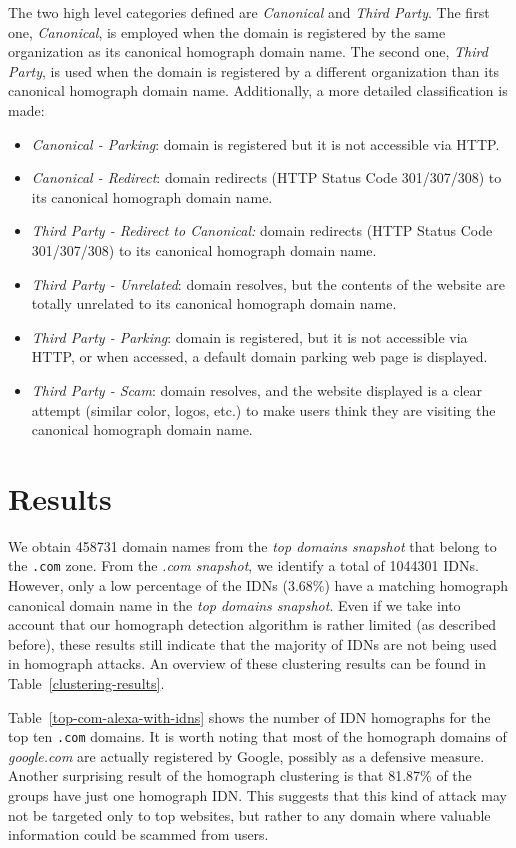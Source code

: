 \documentclass[letterpaper,twocolumn,10pt]{article}
\begin{document}
The two high level categories defined are \textit{Canonical} and \textit{Third Party}.
The first one, \textit{Canonical}, is employed when the domain is registered by the same organization as its canonical homograph domain name.
The second one, \textit{Third Party}, is used when the domain is registered by a different organization than its canonical homograph domain name.
Additionally, a more detailed classification is made:
\begin{itemize}
\setlength{\itemsep}{0pt}
\setlength{\parskip}{0pt}
\setlength{\parsep}{0pt}
\item \textit{Canonical - Parking}: domain is registered but it is not accessible via HTTP.
\item \textit{Canonical - Redirect}: domain redirects (HTTP Status Code 301/307/308) to its canonical homograph domain name.
\item \textit{Third Party - Redirect to Canonical:} domain redirects (HTTP Status Code 301/307/308) to its canonical homograph domain name.
\item \textit{Third Party - Unrelated}: domain resolves, but the contents of the website are totally unrelated to its canonical homograph domain name.
\item \textit{Third Party - Parking}: domain is registered, but it is not accessible via HTTP, or when accessed, a default domain parking web page is displayed.
\item \textit{Third Party - Scam}: domain resolves, and the website displayed is a clear attempt (similar color, logos, etc.) to make users think they are visiting the canonical homograph domain name.
\end{itemize}

\section{Results}
We obtain 458731 domain names from the \textit{top domains snapshot} that belong to the \texttt{.com} zone.
From the \textit{.com snapshot}, we identify a total of 1044301 IDNs.
However, only a low percentage of the IDNs (3.68\%) have a matching homograph canonical domain name in the \textit{top domains snapshot}.
Even if we take into account that our homograph detection algorithm is rather limited (as described before), these results still indicate that the majority of IDNs are not being used in homograph attacks.
An overview of these clustering results can be found in Table~\ref{clustering-results}.

Table~\ref{top-com-alexa-with-idns} shows the number of IDN homographs for the top ten \texttt{.com} domains.
It is worth noting that most of the homograph domains of \textit{google.com} are actually registered by Google, possibly as a defensive measure.
Another surprising result of the homograph clustering is that 81.87\% of the groups have just one homograph IDN.
This suggests that this kind of attack may not be targeted only to top websites, but rather to any domain where valuable information could be scammed from users.
\end{document}
